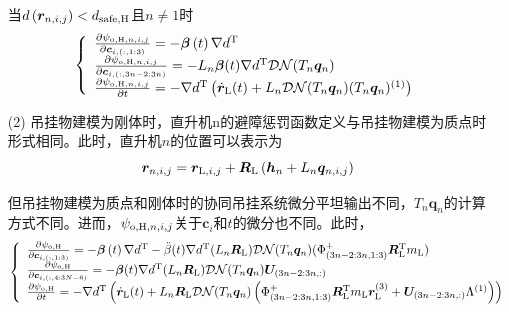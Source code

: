 \begin{enumerate}
    当$d\left({\boldsymbol{r}}_{n,i,j}\right) < d_{\rm{safe, H}}$且$n\ne1$时
    \begin{equation}
        \left\{\begin{array}{l}
            \frac{\partial \psi_{{\rm{o,H}},n,i,j}}{\partial \boldsymbol{c}_{i,(:,1:3)}} = - \boldsymbol{\beta}\left(t\right)\nabla d^{\rm{T}}\\
            \frac{\partial \psi_{{\rm{o,H}},n,i,j}}{\partial \boldsymbol{c}_{i,(:,3n-2:3n)}} = -L_n{\boldsymbol{\beta}}(t) \nabla d^{\rm{T}}\mathcal{DN}(T_n\boldsymbol{q}_n) \\
            \frac{\partial \psi_{{\rm{o,H}},n,i,j}}{\partial t} = -\nabla d^{\rm{T}} \left(
                \dot{\boldsymbol{r}}_{\rm{L}}(t) + L_n\mathcal{DN}(T_n\boldsymbol{q}_n)(T_n\boldsymbol{q}_n)^{(1)}
            \right) 
        \end{array}
        \right.
    \end{equation}

    \item [(2)] 吊挂物建模为刚体时，直升机n的避障惩罚函数定义与吊挂物建模为质点时形式相同。此时，直升机$n$的位置可以表示为
    \begin{equation}
        \boldsymbol{r}_{n,i,j} = \boldsymbol{r}_{{\rm{L}}, i,j} + \boldsymbol{R}_{\rm{L}}\left(\boldsymbol{h}_n+L_n\boldsymbol{q}_{n,i,j}\right) 
    \end{equation}

    但吊挂物建模为质点和刚体时的协同吊挂系统微分平坦输出不同，$T_n\boldsymbol{q}_n$的计算方式不同。进而，$\psi_{{\rm{o,H}},n,i,j}$关于$\boldsymbol{c}_i$和$t$的微分也不同。此时，
    \begin{equation}
        \left\{\begin{array}{l}
            \frac{\partial \psi_{\rm{o,H}}}{\partial \boldsymbol{c}_{i,(:,1:3)}} = - \boldsymbol{\beta}\left(t\right) \nabla d^{\rm{T}} - \ddot{\beta}(t)\nabla d^{\rm{T}}(L_n\boldsymbol{R}_{\rm{L}})\mathcal{DN}(T_n\boldsymbol{q}_n)(\Phi^{+}_{(3n-2:3n,1:3)}\boldsymbol{R}{\rm{^T_L}}m_{\rm{L}})\\
            \frac{\partial \psi_{\rm{o,H}}}{\partial \boldsymbol{c}_{i,(:,4:3N-6)}} = - \boldsymbol{\beta}(t) \nabla d^{\rm{T}} (L_n\boldsymbol{R}_{\rm{L}}) \mathcal{DN}(T_n\boldsymbol{q}_n) \boldsymbol{U}_{(3n-2:3n, :)} \\
            \frac{\partial \psi_{\rm{o,H}}}{\partial t} = -\nabla d^{\rm{T}} \left(
                \dot{\boldsymbol{r}}_{\rm{L}}(t) + L_n\boldsymbol{R}_{\rm{L}}\mathcal{DN}(T_n\boldsymbol{q}_n)\left(
                    \Phi^{+}_{(3n-2:3n,1:3)}\boldsymbol{R}{\rm{_L^T}}m_{\rm{L}}\boldsymbol{r}_{\rm{L}}^{(3)} + \boldsymbol{U}_{(3n-2:3n, :)} {\Lambda}^{(1)}
                \right)
            \right) 
        \end{array}
        \right.
    \end{equation}

\end{enumerate}


